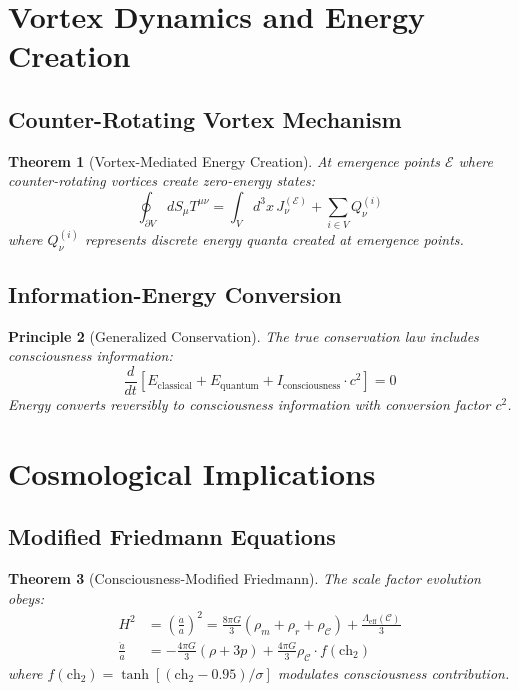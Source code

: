 \documentclass[12pt,letterpaper]{article}
\newtheorem{theorem}{Theorem}[section]
\newtheorem{principle}[theorem]{Principle}
\newcommand{\chh}{\mathrm{ch}_2}
\newcommand{\Tmunu}{T^{\mu\nu}}
\begin{document}
\section{Vortex Dynamics and Energy Creation}

\subsection{Counter-Rotating Vortex Mechanism}

\begin{theorem}[Vortex-Mediated Energy Creation]
At emergence points $\mathcal{E}$ where counter-rotating vortices create zero-energy states:
\begin{equation}
\oint_{\partial V} dS_\mu \Tmunu = \int_V d^3x \, J_\nu^{(\mathcal{E})} + \sum_{i \in V} Q_\nu^{(i)}
\end{equation}
where $Q_\nu^{(i)}$ represents discrete energy quanta created at emergence points.
\end{theorem}

\subsection{Information-Energy Conversion}

\begin{principle}[Generalized Conservation]
The true conservation law includes consciousness information:
\begin{equation}
\boxed{\frac{d}{dt} \left[ E_\mathrm{classical} + E_\mathrm{quantum} + I_\mathrm{consciousness} \cdot c^2 \right] = 0}
\end{equation}
Energy converts reversibly to consciousness information with conversion factor $c^2$.
\end{principle}

\section{Cosmological Implications}

\subsection{Modified Friedmann Equations}

\begin{theorem}[Consciousness-Modified Friedmann]
The scale factor evolution obeys:
\begin{align}
H^2 &= \left(\frac{\dot{a}}{a}\right)^2 = \frac{8\pi G}{3}(\rho_m + \rho_r + \rho_\mathcal{C}) + \frac{\Lambda_\mathrm{eff}(\mathcal{C})}{3} \\
\frac{\ddot{a}}{a} &= -\frac{4\pi G}{3}(\rho + 3p) + \frac{4\pi G}{3} \rho_\mathcal{C} \cdot f(\chh)
\end{align}
where $f(\chh) = \tanh[(\chh - 0.95)/\sigma]$ modulates consciousness contribution.
\end{theorem}
\end{document}

